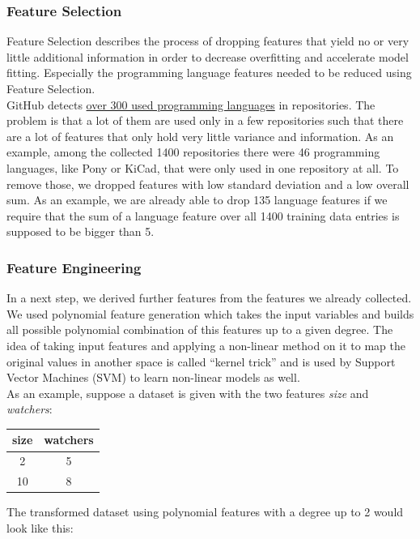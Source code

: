 \documentclass{article}
\begin{document}
\subsubsection{Feature Selection}\label{feature-selection}

Feature Selection describes the process of dropping features that yield
no or very little additional information in order to decrease
overfitting and accelerate model fitting. Especially the programming
language features needed to be reduced using Feature Selection.\\
GitHub detects
\href{https://github.com/github/linguist/blob/master/lib/linguist/languages.yml}{over
300 used programming languages} in repositories. The problem is that a
lot of them are used only in a few repositories such that there are a
lot of features that only hold very little variance and information. As
an example, among the collected 1400 repositories there were 46
programming languages, like Pony or KiCad, that were only used in one
repository at all. To remove those, we dropped features with low
standard deviation and a low overall sum. As an example, we are already
able to drop 135 language features if we require that the sum of a
language feature over all 1400 training data entries is supposed to be
bigger than 5.

\subsubsection{Feature Engineering}\label{feature-engineering}

In a next step, we derived further features from the features we already
collected. We used polynomial feature generation which takes the input
variables and builds all possible polynomial combination of this
features up to a given degree. The idea of taking input features and
applying a non-linear method on it to map the original values in another
space is called ``kernel trick'' and is used by Support Vector Machines
(SVM) to learn non-linear models as well.\\
As an example, suppose a dataset is given with the two features
\emph{size} and \emph{watchers}:

\begin{longtable}[]{@{}cc@{}}
\toprule
size & watchers\tabularnewline
\midrule
\endhead
2 & 5\tabularnewline
10 & 8\tabularnewline
\bottomrule
\end{longtable}

The transformed dataset using polynomial features with a degree up to 2
would look like this:
\end{document}
